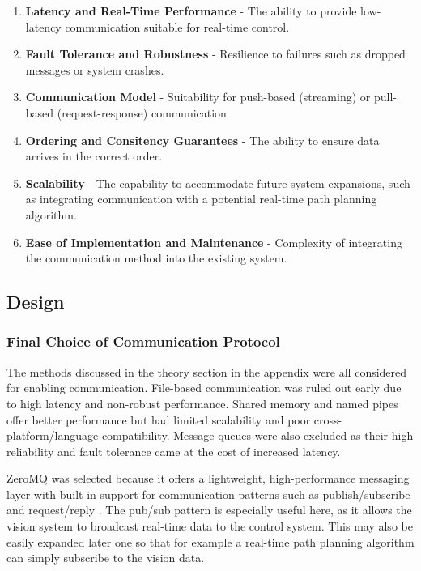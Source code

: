 \begin{enumerate}
    \item \textbf{Latency and Real-Time Performance} - The ability to provide low-latency communication suitable for real-time control.
    \item \textbf{Fault Tolerance and Robustness} - Resilience to failures such as dropped messages or system crashes.
    \item \textbf{Communication Model} - Suitability for push-based (streaming) or pull-based (request-response) communication
    \item \textbf{Ordering and Consitency Guarantees} - The ability to ensure data arrives in the correct order.
    \item \textbf{Scalability} - The capability to accommodate future system expansions, such as integrating communication with a potential real-time path planning algorithm.
    \item \textbf{Ease of Implementation and Maintenance} - Complexity of integrating the communication method into the existing system.
\end{enumerate}

\subsection{Design}
\subsubsection{Final Choice of Communication Protocol}
The methods discussed in the theory section in the appendix were all considered for enabling communication. File-based communication was ruled out early due to high latency and non-robust performance. Shared memory and named pipes offer better performance but had limited scalability and poor cross-platform/language compatibility. Message queues were also excluded as their high reliability and fault tolerance came at the cost of increased latency.

ZeroMQ was selected because it offers a lightweight, high-performance messaging layer with built in support for communication patterns such as publish/subscribe and request/reply \cite{lauener_how_2018}. The pub/sub pattern is especially useful here, as it allows the vision system to broadcast real-time data to the control system. This may also be easily expanded later one so that for example a real-time path planning algorithm can simply subscribe to the vision data.

